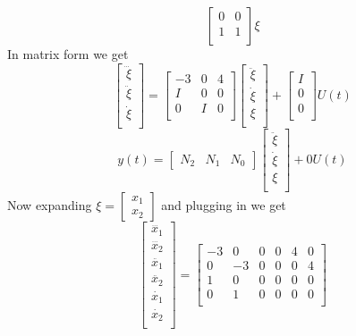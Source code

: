 \documentclass{article}
\begin{document}
\begin{enumerate}[(a)]
$$\begin{bmatrix}
0 & 0 \\
1 & 1 \\
\end{bmatrix}
\xi
$$
In matrix form we get
$$
\begin{bmatrix}
\dddot{\xi} \\
\ddot{\xi} \\
\dot{\xi} \\
\end{bmatrix}
=
\begin{bmatrix}
-3 & 0 & 4 \\
I & 0 & 0 \\
0 & I & 0 \\
\end{bmatrix}
\begin{bmatrix}
\ddot{\xi} \\
\dot{\xi} \\
\xi \\
\end{bmatrix}
+
\begin{bmatrix}
I \\
0 \\
0 \\
\end{bmatrix}
U(t)
$$
$$
y(t) =
\begin{bmatrix}
N_2 & N_1 & N_0
\end{bmatrix}
\begin{bmatrix}
\ddot{\xi} \\
\dot{\xi} \\
\xi \\
\end{bmatrix}
+
0 U(t)
$$
Now expanding $\xi = \begin{bmatrix} x_1 \\ x_2 \end{bmatrix}$ and plugging in we get
$$
\begin{bmatrix}
\dddot{x_1} \\
\dddot{x_2} \\
\ddot{x_1} \\
\ddot{x_2} \\
\dot{x_1} \\
\dot{x_2} \\
\end{bmatrix}
=
\begin{bmatrix}
-3 &  0 & 0 & 0 & 4 & 0 \\
 0 & -3 & 0 & 0 & 0 & 4 \\
 1 &  0 & 0 & 0 & 0 & 0 \\
 0 &  1 & 0 & 0 & 0 & 0 \\

\end{bmatrix}$$
\end{enumerate}
\end{document}
